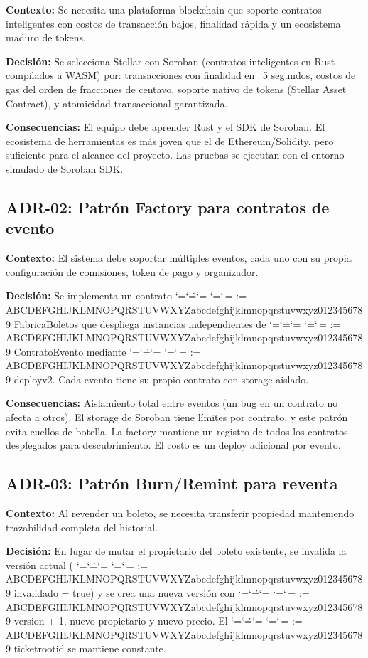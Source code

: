 \documentclass[12pt,oneside]{article}
\makeatletter
\def\ttbreak@uscore{\char95\penalty0\hskip0pt\relax}%
\def\ttbreak@actcat#1{\catcode`#1=\active}%
\def\ttbreak@chars{%
  \catcode`\/=\active \catcode`\.=\active \catcode`\:=\active
  \catcode`\-=\active \catcode`\,=\active
  \@tfor\ttbreak@c:=%
ABCDEFGHIJKLMNOPQRSTUVWXYZabcdefghijklmnopqrstuvwxyz0123456789\do{%
    \expandafter\ttbreak@actcat\ttbreak@c}%
  \let\_\ttbreak@uscore}%
\DeclareRobustCommand{\texttt}{\begingroup\ttfamily\ttbreak@chars\ttbreak@grab}
\def\ttbreak@grab#1{#1\endgroup}
\makeatother
\begin{document}
\textbf{Contexto:} Se necesita una plataforma blockchain que soporte contratos inteligentes con costos de transacción bajos, finalidad rápida y un ecosistema maduro de tokens.

\textbf{Decisión:} Se selecciona Stellar con Soroban (contratos inteligentes en Rust compilados a WASM) por: transacciones con finalidad en ~5 segundos, costos de gas del orden de fracciones de centavo, soporte nativo de tokens (Stellar Asset Contract), y atomicidad transaccional garantizada.

\textbf{Consecuencias:} El equipo debe aprender Rust y el SDK de Soroban. El ecosistema de herramientas es más joven que el de Ethereum/Solidity, pero suficiente para el alcance del proyecto. Las pruebas se ejecutan con el entorno simulado de Soroban SDK.

\subsection{ADR-02: Patrón Factory para contratos de evento}

\textbf{Contexto:} El sistema debe soportar múltiples eventos, cada uno con su propia configuración de comisiones, token de pago y organizador.

\textbf{Decisión:} Se implementa un contrato \texttt{FabricaBoletos} que despliega instancias independientes de \texttt{ContratoEvento} mediante \texttt{deploy\_v2}. Cada evento tiene su propio contrato con storage aislado.

\textbf{Consecuencias:} Aislamiento total entre eventos (un bug en un contrato no afecta a otros). El storage de Soroban tiene límites por contrato, y este patrón evita cuellos de botella. La factory mantiene un registro de todos los contratos desplegados para descubrimiento. El costo es un deploy adicional por evento.

\subsection{ADR-03: Patrón Burn/Remint para reventa}

\textbf{Contexto:} Al revender un boleto, se necesita transferir propiedad manteniendo trazabilidad completa del historial.

\textbf{Decisión:} En lugar de mutar el propietario del boleto existente, se invalida la versión actual (\texttt{invalidado = true}) y se crea una nueva versión con \texttt{version + 1}, nuevo propietario y nuevo precio. El \texttt{ticket\_root\_id} se mantiene constante.
\end{document}
